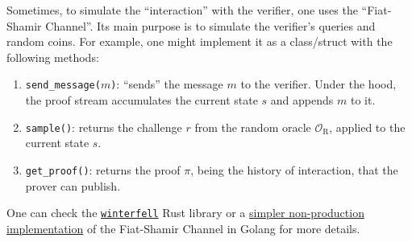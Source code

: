 \documentclass[../lecture-notes-148x210.tex]{subfiles}
\begin{document}
\begin{remark}
    Sometimes, to simulate the ``interaction'' with the verifier, one uses the
    ``Fiat-Shamir Channel''. Its main purpose is to simulate the verifier's
    queries and random coins. For example, one might implement it as a
    class/struct with the following methods:
    \begin{enumerate}
        \item \texttt{send\_message($m$)}: ``sends'' the message $m$ to the verifier. Under the hood, the proof stream accumulates the current state $s$ and appends $m$ to it.
        \item \texttt{sample()}: returns the challenge $r$ from the random oracle $\mathcal{O}_{\text{R}}$, applied to the current state $s$.
        \item \texttt{get\_proof()}: returns the proof $\pi$, being the history of interaction, that the prover can publish.
    \end{enumerate}

    One can check the \href{https://github.com/facebook/winterfell/blob/main/prover/src/channel.rs}{\texttt{winterfell}} Rust library or a \href{https://github.com/actuallyachraf/zkstarks/blob/master/fs.go}{simpler non-production implementation} of the Fiat-Shamir Channel in Golang for more details.
\end{remark}
\end{document}
